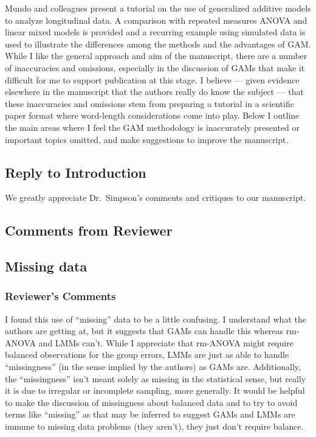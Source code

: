 \documentclass[
]{article}
\begin{document}
Mundo and colleagues present a tutorial on the use of generalized additive models to analyze longitudinal data. A comparison with repeated measures ANOVA and linear mixed models is provided and a recurring example using simulated
data is used to illustrate the differences among the methods and the advantages of GAM. While I like the general approach and aim of the manuscript, there are a number of inaccuracies and omissions, especially in the discussion of GAMs that make it difficult for me to support publication at this stage. I believe --- given evidence elsewhere in the manuscript that the authors really do know the subject --- that these inaccuracies and omissions stem from preparing a tutorial in a scientific paper format where word-length considerations come into play. Below I outline the main areas where I feel the GAM methodology is inaccurately presented or important topics omitted, and make suggestions to improve the manuscript.

\hypertarget{section}{%
\subsection{\texorpdfstring{\textcolor{reviewersblue} {Reply to Introduction}}{}}\label{section}}

We greatly appreciate Dr.~Simpson's comments and critiques to our manuscript.

\hypertarget{comments-from-reviewer}{%
\subsection{Comments from Reviewer}\label{comments-from-reviewer}}

\hypertarget{missing-data}{%
\subsection{Missing data}\label{missing-data}}

\hypertarget{reviewers-comments}{%
\subsubsection{Reviewer's Comments}\label{reviewers-comments}}

I found this use of ``missing'' data to be a little confusing. I understand what the authors are getting at, but it suggests that GAMs can handle this whereas rm-ANOVA and LMMs can't. While I appreciate that rm-ANOVA might require
balanced observations for the group errors, LMMs are just as able to handle ``missingness'' (in the sense implied by the authors) as GAMs are. Additionally, the ``missingness'' isn't meant solely as missing in the statistical sense, but really it is due to irregular or incomplete sampling, more generally.
It would be helpful to make the discussion of missingness about balanced data and to try to avoid terms like ``missing'' as that may be inferred to suggest GAMs and LMMs are immune to missing data problems (they aren't), they
just don't require balance.
\end{document}
